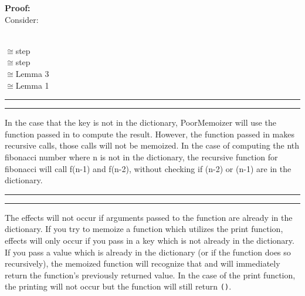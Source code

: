 \documentclass[11pt,letterpaper]{article}
\newcommand{\question}[2] {\vspace{.25in} \hrule\vspace{0.5em}
\noindent{\bf #1: #2} \vspace{0.5em}
\hrule \vspace{.10in}}
\begin{document}
\textbf{Proof:}\\
Consider:

\\
$\cong$\qquad\qquad\qquad step\\
$\cong$\qquad\qquad\qquad\qquad\qquad\qquad\qquad step\\
$\cong$\qquad\qquad\qquad\qquad\qquad\qquad\qquad Lemma 3\\
$\cong$\qquad\qquad\qquad\qquad\qquad\qquad\qquad\qquad Lemma 1

\question{5.3}{}
In the case that the key is not in the dictionary, PoorMemoizer will
use the function passed in to compute the result. However, the function
passed in makes recursive calls, those calls will not be memoized.
In the case of computing the nth fibonacci number where n is not
in the dictionary, the recursive function for fibonacci
will call f(n-1) and f(n-2), without checking if (n-2) or (n-1) are in the 
dictionary.

\question{5.5}{}
The effects will not occur if arguments passed to the function 
are already in the dictionary. If you try to memoize a function which utilizes 
the print function, effects will only occur if you pass in a key which is 
not already in the dictionary. If you pass a value which is already
in the dictionary (or if the function does so recursively), the memoized
function will recognize that and will immediately return the function's
previously returned value. In the case of the print function, the printing will
not occur but the function will still return \texttt{()}.
\end{document}
